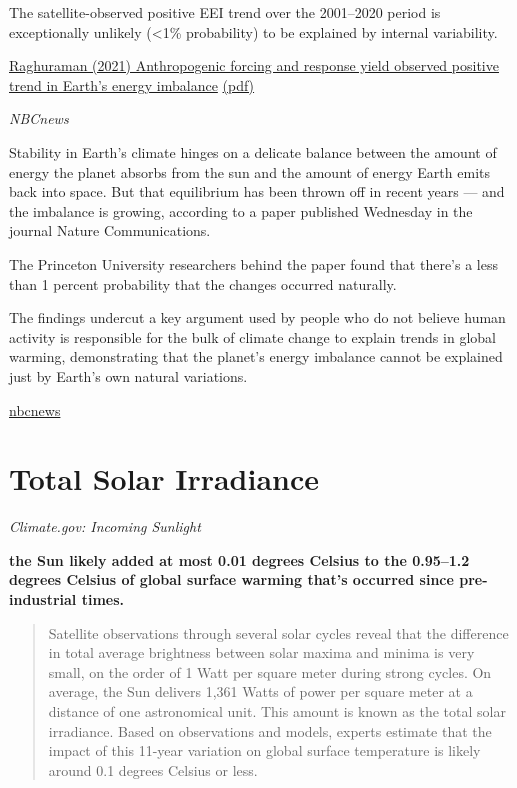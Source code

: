 \documentclass[
]{book}
\begin{document}
The satellite-observed positive EEI trend over the 2001--2020
period is exceptionally unlikely (\textless1\% probability) to be
explained by internal variability.

\href{https://www.nature.com/articles/s41467-021-24544-4}{Raghuraman (2021) Anthropogenic forcing and response yield observed positive trend in Earth's energy imbalance}
\href{pdf/Raghuraman_2021_TEEI.pdf}{(pdf)}

\emph{NBCnews}

Stability in Earth's climate hinges on a delicate balance between the amount of energy the planet absorbs from the sun and the amount of energy Earth emits back into space. But that equilibrium has been thrown off in recent years --- and the imbalance is growing, according to a paper published Wednesday in the journal Nature Communications.

The Princeton University researchers behind the paper found that there's a less than 1 percent probability that the changes occurred naturally.

The findings undercut a key argument used by people who do not believe human activity is responsible for the bulk of climate change to explain trends in global warming, demonstrating that the planet's energy imbalance cannot be explained just by Earth's own natural variations.

\href{https://www.nbcnews.com/science/environment/earths-energy-imbalance-removes-almost-doubt-human-made-climate-change-rcna1562}{nbcnews}

\hypertarget{total-solar-irradiance}{%
\section{Total Solar Irradiance}\label{total-solar-irradiance}}

\emph{Climate.gov: Incoming Sunlight}

\textbf{the Sun likely added at most 0.01 degrees Celsius to the 0.95--1.2 degrees Celsius of global surface warming that's occurred since pre-industrial times.}

\begin{quote}
Satellite observations through several solar cycles reveal that the difference in total average brightness between solar maxima and minima is very small, on the order of 1 Watt per square meter during strong cycles. On average, the Sun delivers 1,361 Watts of power per square meter at a distance of one astronomical unit. This amount is known as the total solar irradiance. Based on observations and models, experts estimate that the impact of this 11-year variation on global surface temperature is likely around 0.1 degrees Celsius or less.
\end{quote}
\end{document}
